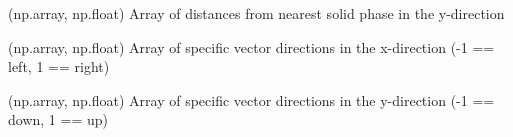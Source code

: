 \documentclass[letterpaper,10pt,english]{sphinxmanual}
\begin{document}
\begin{fulllineitems}
\begin{fulllineitems}
\end{fulllineitems}


\begin{fulllineitems}
\label{\detokenize{index:lb_colloids.Colloids.Colloid_Setup.GridArray.gridy}}
 \textendash{} (np.array, np.float) Array of distances from nearest solid phase in the y-direction

\end{fulllineitems}


\begin{fulllineitems}
\label{\detokenize{index:lb_colloids.Colloids.Colloid_Setup.GridArray.vector_x}}
 \textendash{} (np.array, np.float) Array of specific vector directions in the x-direction (-1 == left, 1 == right)

\end{fulllineitems}


\begin{fulllineitems}
\label{\detokenize{index:lb_colloids.Colloids.Colloid_Setup.GridArray.vector_y}}
 \textendash{} (np.array, np.float) Array of specific vector directions in the y-direction (-1 == down, 1 == up)

\end{fulllineitems}


\end{fulllineitems}

\end{document}
